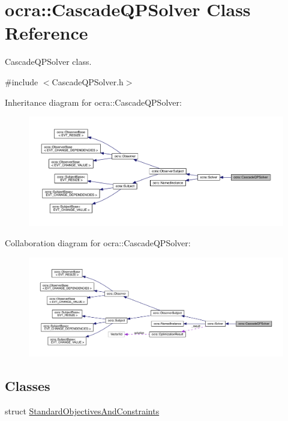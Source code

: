 \hypertarget{classocra_1_1CascadeQPSolver}{}\section{ocra\+:\+:Cascade\+Q\+P\+Solver Class Reference}
\label{classocra_1_1CascadeQPSolver}


Cascade\+Q\+P\+Solver class.  




{\ttfamily \#include $<$Cascade\+Q\+P\+Solver.\+h$>$}



Inheritance diagram for ocra\+:\+:Cascade\+Q\+P\+Solver\+:\nopagebreak
\begin{figure}[H]
\begin{center}
\leavevmode
\includegraphics[width=350pt]{d5/d00/classocra_1_1CascadeQPSolver__inherit__graph}
\end{center}
\end{figure}


Collaboration diagram for ocra\+:\+:Cascade\+Q\+P\+Solver\+:\nopagebreak
\begin{figure}[H]
\begin{center}
\leavevmode
\includegraphics[width=350pt]{d0/dfe/classocra_1_1CascadeQPSolver__coll__graph}
\end{center}
\end{figure}
\subsection*{Classes}
\begin{DoxyCompactItemize}
\item 
struct \hyperlink{structocra_1_1CascadeQPSolver_1_1StandardObjectivesAndConstraints}{Standard\+Objectives\+And\+Constraints}
\end{DoxyCompactItemize}
